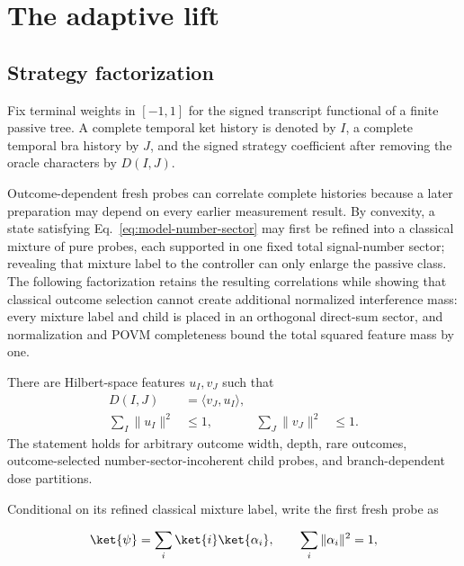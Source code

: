 \section{The adaptive lift}
\label{sec:adaptive}

\subsection{Strategy factorization}

Fix terminal weights in $[-1,1]$ for the signed transcript functional of a finite passive tree. A complete temporal ket history is denoted by $I$, a complete temporal bra history by $J$, and the signed strategy coefficient after removing the oracle characters by $D(I,J)$.

Outcome-dependent fresh probes can correlate complete histories because a later preparation may depend on every earlier measurement result. By convexity, a state satisfying Eq.~\eqref{eq:model-number-sector} may first be refined into a classical mixture of pure probes, each supported in one fixed total signal-number sector; revealing that mixture label to the controller can only enlarge the passive class. The following factorization retains the resulting correlations while showing that classical outcome selection cannot create additional normalized interference mass: every mixture label and child is placed in an orthogonal direct-sum sector, and normalization and POVM completeness bound the total squared feature mass by one.

\begin{lemma}
\label{lem:adaptive-factorization}
There are Hilbert-space features $u_I,v_J$ such that
\begin{align}
D(I,J)&=\langle v_J,u_I\rangle,
\\
\sum_I\|u_I\|^2&\le1,
&
\sum_J\|v_J\|^2&\le1.
\label{eq:adaptive-invariant}
\end{align}
The statement holds for arbitrary outcome width, depth, rare outcomes, outcome-selected number-sector-incoherent child probes, and branch-dependent dose partitions.
\end{lemma}

Conditional on its refined classical mixture label, write the first fresh probe as

\begin{equation}
\ket{\psi}=\sum_i\ket{i}\ket{\alpha_i},
\qquad
\sum_i\|\alpha_i\|^2=1,
\end{equation}

